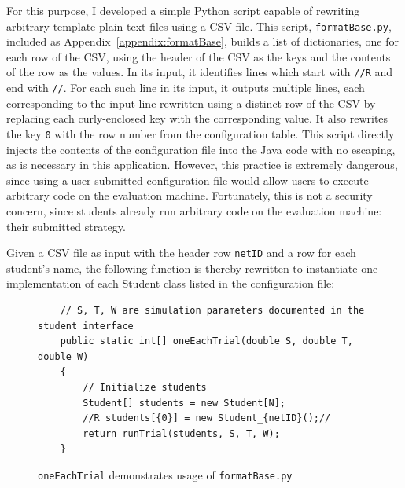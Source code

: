 \documentclass[pageno]{jpaper}
\begin{document}
For this purpose, I developed a simple Python script capable of rewriting arbitrary template plain-text files using a CSV file.
This script, \texttt{formatBase.py}, included as Appendix~\ref{appendix:formatBase}, builds a list of dictionaries, one for each row of the CSV, using the header of the CSV as the keys and the contents of the row as the values.
In its input, it identifies lines which start with \texttt{//R} and end with \texttt{//}.
For each such line in its input, it outputs multiple lines, each corresponding to the input line rewritten using a distinct row of the CSV by replacing each curly-enclosed key with the corresponding value.
It also rewrites the key \texttt{0} with the row number from the configuration table.
This script directly injects the contents of the configuration file into the Java code with no escaping, as is necessary in this application.
However, this practice is extremely dangerous, since using a user-submitted configuration file would allow users to execute arbitrary code on the evaluation machine.
Fortunately, this is not a security concern, since students already run arbitrary code on the evaluation machine: their submitted strategy.

Given a CSV file as input with the header row \texttt{netID} and a row for each student's name, the following function is thereby rewritten to instantiate one implementation of each Student class listed in the configuration file:
\begin{figure}[hbt]
\begin{verbatim}
    // S, T, W are simulation parameters documented in the student interface
    public static int[] oneEachTrial(double S, double T, double W)
    {
        // Initialize students
        Student[] students = new Student[N];
        //R students[{0}] = new Student_{netID}();//
        return runTrial(students, S, T, W);
    }
\end{verbatim}
  \caption{\texttt{oneEachTrial} demonstrates usage of \texttt{formatBase.py}}\label{minted:oneEachTrial}
\end{figure}
\end{document}

